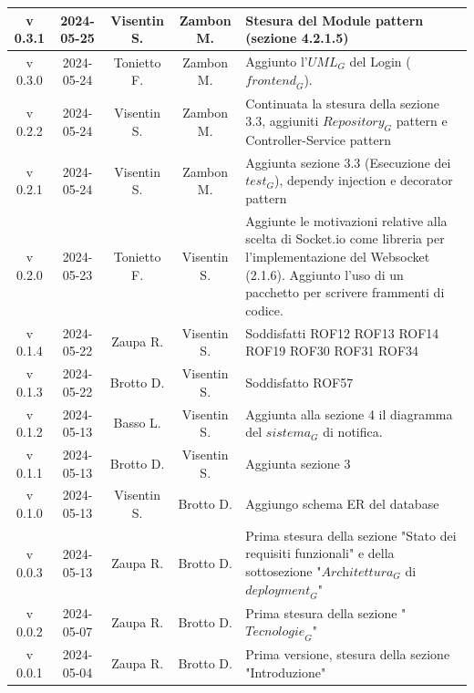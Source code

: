 \documentclass[12pt, oneside]{article}
\begin{document}
\begin{longtable}{|c|c|c|c|p{7cm}|}
\hline
v 0.3.1 & 2024-05-25 & Visentin S. & Zambon M. & Stesura del Module pattern (sezione 4.2.1.5) \\
\hline
v 0.3.0 & 2024-05-24 & Tonietto F. & Zambon M. & Aggiunto l'$\textit{UML}_G$ del Login ($\textit{frontend}_G$). \\
\hline
v 0.2.2 & 2024-05-24 & Visentin S. & Zambon M. & Continuata la stesura della sezione 3.3, aggiuniti $\textit{Repository}_G$ pattern e Controller-Service pattern \\
\hline
v 0.2.1 & 2024-05-24 & Visentin S. & Zambon M. & Aggiunta sezione 3.3 (Esecuzione dei $\textit{test}_G$), dependy injection e decorator pattern\\
\hline
v 0.2.0 & 2024-05-23 & Tonietto F. & Visentin S. & Aggiunte le motivazioni relative alla scelta di Socket.io come libreria per l'implementazione del Websocket (2.1.6). Aggiunto l'uso di un pacchetto per scrivere frammenti di codice. \\
\hline
v 0.1.4 & 2024-05-22 & Zaupa R. & Visentin S. & Soddisfatti ROF12 ROF13 ROF14 ROF19 ROF30 ROF31 ROF34\\
\hline
v 0.1.3 & 2024-05-22 & Brotto D. & Visentin S. & Soddisfatto ROF57 \\
\hline
v 0.1.2 & 2024-05-13 & Basso L. & Visentin S. & Aggiunta alla sezione 4 il diagramma del $\textit{sistema}_G$ di notifica. \\
\hline
v 0.1.1 & 2024-05-13 & Brotto D. & Visentin S. & Aggiunta sezione 3 \\
\hline
v 0.1.0 & 2024-05-13 & Visentin S. & Brotto D. & Aggiungo schema ER del database \\
\hline
v 0.0.3 & 2024-05-13 & Zaupa R. & Brotto D. & Prima stesura della sezione "Stato dei requisiti funzionali" e della sottosezione "$\textit{Architettura}_G$ di $\textit{deployment}_G$"\\
\hline
v 0.0.2 & 2024-05-07 & Zaupa R. & Brotto D. & Prima stesura della sezione "$\textit{Tecnologie}_G$"\\
\hline
v 0.0.1 & 2024-05-04 & Zaupa R. & Brotto D. & Prima versione, stesura della sezione "Introduzione" \\
\hline
\end{longtable}
\newpage

\tableofcontents
\newpage


\newpage


\newpage


\newpage


\newpage


\newpage
\end{document}
